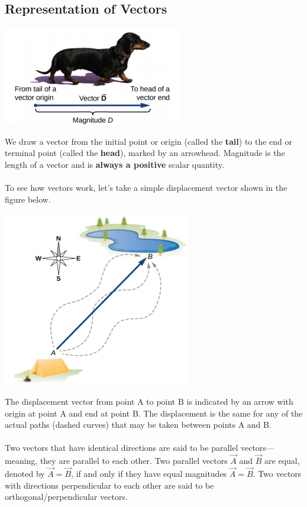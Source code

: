\documentclass[11pt]{article}
\begin{document}
    \subsection*{Representation of Vectors}
    \begin{center}
    \includegraphics[scale=0.5]{dog.png}	
    \end{center}
    We draw a vector from the initial point or origin (called the \textbf{tail}) to the end or terminal point (called the \textbf{head}), marked by an arrowhead. Magnitude is the length of a vector and is \textbf{always a positive }scalar quantity. \\ \\
    To see how vectors work, let's take a simple displacement vector shown in the figure below.
    \begin{center}
    	\includegraphics[scale=0.4]{disp.png}
    \end{center}
    The displacement vector from point A to point B is indicated by an arrow with origin at point A and end at point B. The displacement is the same for any of the actual paths (dashed curves) that may be taken between points A and B. \\ \\
    Two vectors that have identical directions are said to be parallel vectors—meaning, they are parallel to each other. Two parallel vectors $\vec{A}$ and $\vec{B}$ are equal, denoted by $\vec{A}=\vec{B}$, if and only if they have equal magnitudes $\vec{A}=\vec{B}$. Two vectors with directions perpendicular to each other are said to be orthogonal/perpendicular vectors. 
\end{document}
